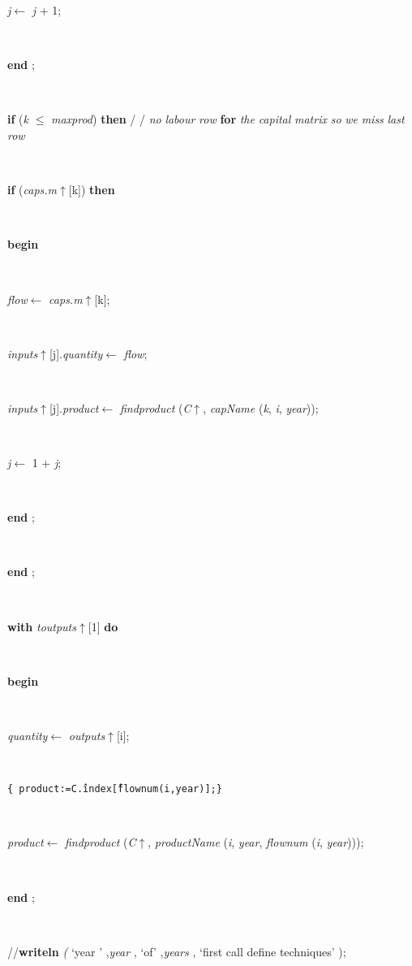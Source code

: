 \documentclass[10pt, a4paper]{article}
\begin{document}
\begin{tabbing}
\parbox{14cm}{\textsf{\textit{j}$\leftarrow$ \textit{j} + 1}; }\\
\<\-\parbox{14cm}{\textsf{\textbf{end} ;}}\\
\+\parbox{14cm}{\textsf {\textbf {if } \textsf{(\textit{k} $\leq$ \textit{maxprod})} \textbf{ then } \textsf{ /   /  \textit{no}  \textit{labour}  \textit{row}    } \textbf{ for } \textsf{\textit{the}  \textit{capital}  \textit{matrix}  \textit{so}  \textit{we}  \textit{miss}  \textit{last}  \textit{row}       }}}\\
\+\parbox{14cm}{\textsf {\textbf {if } \textsf{(\textit{caps.m}$\uparrow$\textit{}[k])} \textbf{ then } }}\\
\<\parbox{14cm}{\textsf{\textbf{begin} }}\\
\parbox{14cm}{\textsf{\textit{flow}$\leftarrow$ \textit{caps.m}$\uparrow$\textit{}[k]}; }\\
\parbox{14cm}{\textsf{\textit{inputs}$\uparrow$\textit{}[j].\textit{quantity}$\leftarrow$ \textit{flow}}; }\\
\parbox{14cm}{\textsf{\textit{inputs}$\uparrow$\textit{}[j].\textit{product}$\leftarrow$ \textit{findproduct} (\textit{C}$\uparrow$\textit{}, \textit{capName} (\textit{k}, \textit{i}, \textit{year}))}; }\\
\parbox{14cm}{\textsf{\textit{j}$\leftarrow$ 1 + \textit{j}}; }\\
\<\-\parbox{14cm}{\textsf{\textbf{end} ;}}\\
\<\-\<\-\parbox{14cm}{\textsf{\textbf{end} ;}}\\
\+\parbox{14cm}{\textsf {\textbf {with } \textsf{\textit{toutputs}$\uparrow$\textit{}[1]} \textbf{ do } }}\\
\<\parbox{14cm}{\textsf{\textbf{begin} }}\\
\parbox{14cm}{\textsf{\textit{quantity}$\leftarrow$ \textit{outputs}$\uparrow$\textit{}[i]}; }\\
\parbox{14cm}{\texttt{\small{\{	product:=C\^.index\^[flownum(i,year)];\}}}}\\
\parbox{14cm}{\textsf{\textit{product}$\leftarrow$ \textit{findproduct} (\textit{C}$\uparrow$\textit{}, \textit{productName} (\textit{i}, \textit{year}, \textit{flownum} (\textit{i}, \textit{year})))}; }\\
\<\-\parbox{14cm}{\textsf{\textbf{end} ;}}\\
\parbox{14cm}{\textsf{//\textbf{writeln} \textit{(} \textrm{\textup { `year ' } },\textit{year} , \textrm{\textup { `of' } },\textit{years} ,\textrm{\textup { `first call define techniques' } });}}\\

\end{tabbing}
\end{document}
